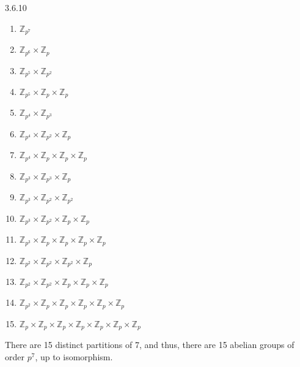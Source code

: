 \documentclass[12pt]{amsart}
\theoremstyle{definition}
\numberwithin{equation}{section}
\newcommand{\Z}{\mathbb{Z}}
\begin{document}
\begin{exercise}{3.6.10}
    \begin{enumerate}[label= (\arabic*)]
        \item \(\Z_{p^7}\)
        \item \(\Z_{p^6} \times \Z_p\)
        \item \(\Z_{p^5} \times \Z_{p^2}\)
        \item \(\Z_{p^5} \times \Z_p \times \Z_p\)
        \item \(\Z_{p^4} \times \Z_{p^3}\)
        \item \(\Z_{p^4} \times \Z_{p^2} \times \Z_p\)
        \item \(\Z_{p^4} \times \Z_p \times \Z_p \times \Z_p\)
        \item \(\Z_{p^3} \times \Z_{p^3} \times \Z_p\)
        \item \(\Z_{p^3} \times \Z_{p^2} \times \Z_{p^2}\)
        \item \(\Z_{p^3} \times \Z_{p^2} \times \Z_p \times \Z_p\)
        \item \(\Z_{p^3} \times \Z_p \times \Z_p \times \Z_p \times \Z_p\)
        \item \(\Z_{p^2} \times \Z_{p^2} \times \Z_{p^2} \times \Z_p\)
        \item \(\Z_{p^2} \times \Z_{p^2} \times \Z_p \times \Z_p \times \Z_p\)
        \item \(\Z_{p^2} \times \Z_p \times \Z_p \times \Z_p \times \Z_p \times \Z_p\)
        \item \(\Z_p \times \Z_p \times \Z_p \times \Z_p \times \Z_p \times \Z_p \times \Z_p\)
    \end{enumerate}
    
    There are 15 distinct partitions of 7, and thus, there are 15 abelian groups of order \(p^7\), up to isomorphism.

\end{exercise}
\newpage
\end{document}
